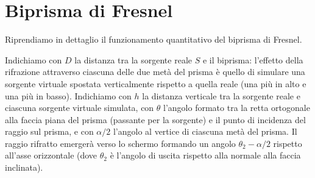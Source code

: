 \documentclass[openany,a4paper,12pt]{book}
\begin{document}
\section{Biprisma di Fresnel}

Riprendiamo in dettaglio il funzionamento quantitativo del biprisma di Fresnel.

Indichiamo con $D$ la distanza tra la sorgente reale $S$ e il biprisma: l'effetto della rifrazione attraverso ciascuna delle due metà del prisma è quello di simulare una sorgente virtuale spostata verticalmente rispetto a quella reale (una più in alto e una più in basso).
Indichiamo con $h$ la distanza verticale tra la sorgente reale e ciascuna sorgente virtuale simulata, con $\theta$ l'angolo formato tra la retta ortogonale alla faccia piana del prisma (passante per la sorgente) e il punto di incidenza del raggio sul prisma, e con $\alpha/2$ l'angolo al vertice di ciascuna metà del prisma. Il raggio rifratto emergerà verso lo schermo formando un angolo $\theta_2 - \alpha/2$ rispetto all'asse orizzontale (dove $\theta_2$ è l'angolo di uscita rispetto alla normale alla faccia inclinata).
\end{document}
